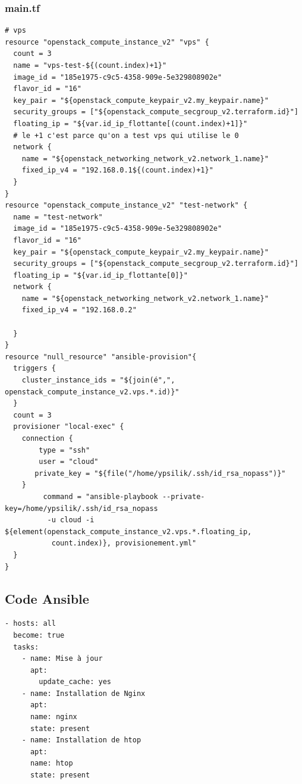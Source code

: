 \documentclass[]{article}
\begin{document}
\subsubsection*{main.tf}
\begin{verbatim}
# vps 
resource "openstack_compute_instance_v2" "vps" {
  count = 3 
  name = "vps-test-${(count.index)+1}"
  image_id = "185e1975-c9c5-4358-909e-5e329808902e"
  flavor_id = "16"
  key_pair = "${openstack_compute_keypair_v2.my_keypair.name}"
  security_groups = ["${openstack_compute_secgroup_v2.terraform.id}"]
  floating_ip = "${var.id_ip_flottante[(count.index)+1]}" 
  # le +1 c'est parce qu'on a test vps qui utilise le 0
  network {
    name = "${openstack_networking_network_v2.network_1.name}"
    fixed_ip_v4 = "192.168.0.1${(count.index)+1}"
  }
}
resource "openstack_compute_instance_v2" "test-network" {
  name = "test-network"
  image_id = "185e1975-c9c5-4358-909e-5e329808902e"
  flavor_id = "16"
  key_pair = "${openstack_compute_keypair_v2.my_keypair.name}"
  security_groups = ["${openstack_compute_secgroup_v2.terraform.id}"]
  floating_ip = "${var.id_ip_flottante[0]}"
  network {
    name = "${openstack_networking_network_v2.network_1.name}"
    fixed_ip_v4 = "192.168.0.2"
    
  }
}
resource "null_resource" "ansible-provision"{
  triggers { 
    cluster_instance_ids = "${join(é",", openstack_compute_instance_v2.vps.*.id)}"
  }
  count = 3 
  provisioner "local-exec" {
    connection {
        type = "ssh"
        user = "cloud"
       private_key = "${file("/home/ypsilik/.ssh/id_rsa_nopass")}"
    }   
         command = "ansible-playbook --private-key=/home/ypsilik/.ssh/id_rsa_nopass
          -u cloud -i ${element(openstack_compute_instance_v2.vps.*.floating_ip,
           count.index)}, provisionement.yml"
  }
}
\end{verbatim}
\subsection*{Code Ansible}
\begin{verbatim}
- hosts: all
  become: true
  tasks:  
    - name: Mise à jour 
      apt:
        update_cache: yes
    - name: Installation de Nginx
      apt:
      name: nginx
      state: present
    - name: Installation de htop
      apt:
      name: htop
      state: present
\end{verbatim}
\end{document}
